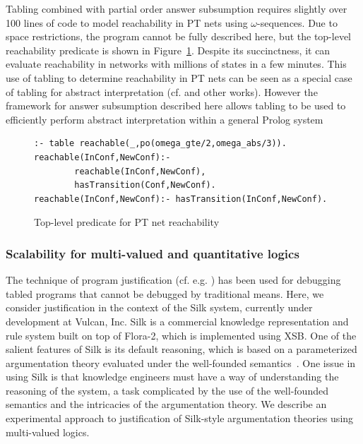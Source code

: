 Tabling combined with partial order answer subsumption requires
slightly over 100 lines of code to model reachability in PT nets using
$\omega$-sequences.  Due to space restrictions, the program cannot be
fully described here, but the top-level reachability predicate is
shown in Figure~\ref{fig:ptnetcode}.  Despite its succinctness, it can
evaluate reachability in networks with millions of states in a few
minutes.  This use of tabling to determine reachability in PT nets can
be seen as a special case of tabling for abstract interpretation
(cf. \cite{KaKa93} and other works).  However the framework for answer
subsumption described here allows tabling to be used to efficiently
perform abstract interpretation within a general Prolog system
%
\begin{figure}
\begin{verbatim}
:- table reachable(_,po(omega_gte/2,omega_abs/3)).
reachable(InConf,NewConf):-
        reachable(InConf,NewConf),
        hasTransition(Conf,NewConf).
reachable(InConf,NewConf):- hasTransition(InConf,NewConf).
\end{verbatim}
\caption{Top-level predicate for PT net reachability}
\label{fig:ptnetcode}
\end{figure}

\subsubsection{Scalability for multi-valued and quantitative logics} \label{sec:mv}
%
The technique of program justification (cf. e.g. \cite{PGDRR04}) has
been used for debugging tabled programs that cannot be debugged by
traditional means.  Here, we consider justification in the context of
the Silk system, currently under development at Vulcan, Inc.  Silk is
a commercial knowledge representation and rule system built on top of
Flora-2, which is implemented using XSB.  One of the salient features
of Silk is its default reasoning, which is based on a parameterized
argumentation theory evaluated under the well-founded
semantics~\cite{WGKFL09}.  One issue in using Silk is that knowledge
engineers must have a way of understanding the reasoning of the
system, a task complicated by the use of the well-founded semantics
and the intricacies of the argumentation theory.  We describe an
experimental approach to justification of Silk-style argumentation
theories using multi-valued logics.


